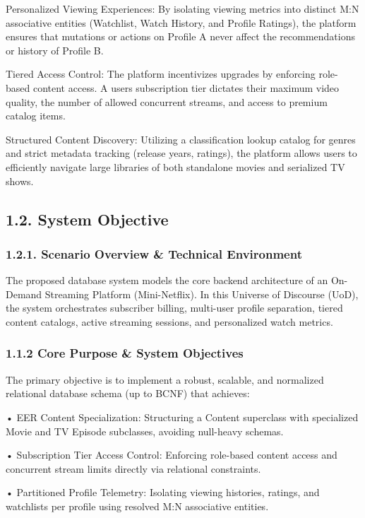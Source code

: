 Personalized Viewing Experiences: By isolating viewing metrics into distinct M:N associative entities (Watchlist, Watch History, and Profile Ratings), the platform ensures that mutations or actions on Profile A never affect the recommendations or history of Profile B.

Tiered Access Control: The platform incentivizes upgrades by enforcing role-based content access. A user\textquotesingle s subscription tier dictates their maximum video quality, the number of allowed concurrent streams, and access to premium catalog items.

Structured Content Discovery: Utilizing a classification lookup catalog for genres and strict metadata tracking (release years, ratings), the platform allows users to efficiently navigate large libraries of both standalone movies and serialized TV shows.

\subsection*{1.2. System Objective}

\subsubsection*{1.2.1. Scenario Overview \& Technical Environment}

The proposed database system models the core backend architecture of an On-Demand Streaming Platform (Mini-Netflix). In this Universe of Discourse (UoD), the system orchestrates subscriber billing, multi-user profile separation, tiered content catalogs, active streaming sessions, and personalized watch metrics.

\subsubsection*{1.1.2 Core Purpose \& System Objectives}

The primary objective is to implement a robust, scalable, and normalized relational database schema (up to BCNF) that achieves:

• EER Content Specialization: Structuring a Content superclass with specialized Movie and TV Episode subclasses, avoiding null-heavy schemas.

• Subscription Tier Access Control: Enforcing role-based content access and concurrent stream limits directly via relational constraints.

• Partitioned Profile Telemetry: Isolating viewing histories, ratings, and watchlists per profile using resolved M:N associative entities.

